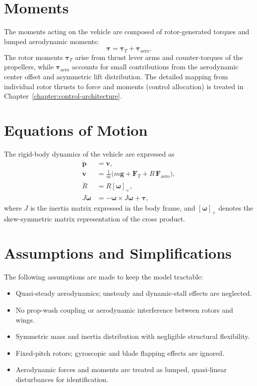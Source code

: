 \section{Moments}
The moments acting on the vehicle are composed of rotor-generated torques and lumped aerodynamic moments:
\begin{equation}
\boldsymbol{\tau} = \boldsymbol{\tau}_T + \boldsymbol{\tau}_\text{aero}.
\end{equation}
The rotor moments $\boldsymbol{\tau}_T$ arise from thrust lever arms and counter-torques of the propellers, while $\boldsymbol{\tau}_\text{aero}$ accounts for small contributions from the aerodynamic center offset and asymmetric lift distribution.
The detailed mapping from individual rotor thrusts to force and moments (control allocation) is treated in Chapter~\ref{chapter:control-architecture}.

\section{Equations of Motion}
The rigid-body dynamics of the vehicle are expressed as
\begin{align}
\dot{\mathbf{p}} &= \mathbf{v}, \\
\dot{\mathbf{v}} &= \tfrac{1}{m}\big( m\mathbf{g} + \mathbf{F}_T + R\,\mathbf{F}_\text{aero} \big), \\
\dot{R} &= R[\boldsymbol{\omega}]_\times, \\
J\dot{\boldsymbol{\omega}} &= -\boldsymbol{\omega}\times J\boldsymbol{\omega} + \boldsymbol{\tau},
\end{align}
where $J$ is the inertia matrix expressed in the body frame, and $[\boldsymbol{\omega}]_\times$ denotes the skew-symmetric matrix representation of the cross product.

\section{Assumptions and Simplifications}
The following assumptions are made to keep the model tractable:
\begin{itemize}
    \item Quasi-steady aerodynamics; unsteady and dynamic-stall effects are neglected.
    \item No prop-wash coupling or aerodynamic interference between rotors and wings.
    \item Symmetric mass and inertia distribution with negligible structural flexibility.
    \item Fixed-pitch rotors; gyroscopic and blade flapping effects are ignored.
    \item Aerodynamic forces and moments are treated as lumped, quasi-linear disturbances for identification.
\end{itemize}

